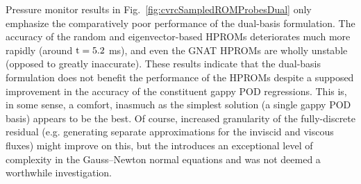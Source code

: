 Pressure monitor results in Fig.~\ref{fig:cvrcSampledROMProbesDual} only emphasize the comparatively poor performance of the dual-basis formulation. The accuracy of the random and eigenvector-based HPROMs deteriorates much more rapidly (around $\text{t} = 5.2$ ms), and even the GNAT HPROMs are wholly unstable (opposed to greatly inaccurate). These results indicate that the dual-basis formulation does not benefit the performance of the HPROMs despite a supposed improvement in the accuracy of the constituent gappy POD regressions. This is, in some sense, a comfort, inasmuch as the simplest solution (a single gappy POD basis) appears to be the best. Of course, increased granularity of the fully-discrete residual (e.g. generating separate approximations for the inviscid and viscous fluxes) might improve on this, but the introduces an exceptional level of complexity in the Gauss--Newton normal equations and was not deemed a worthwhile investigation. 